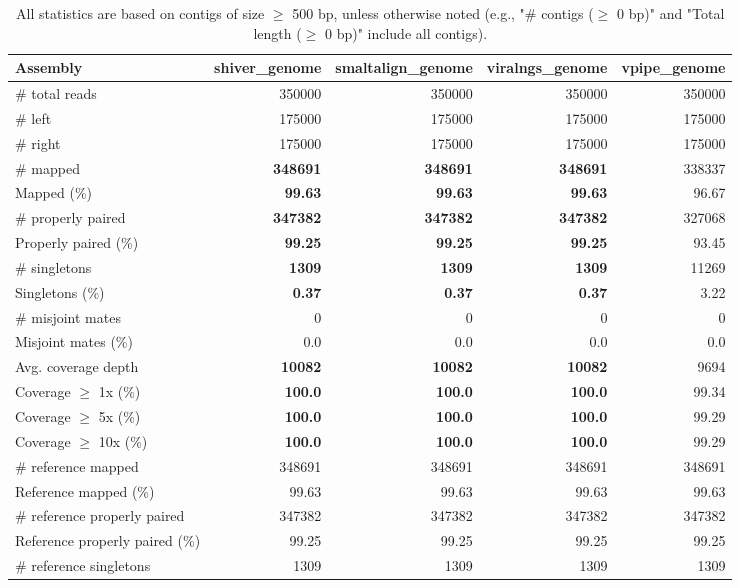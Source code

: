 \documentclass[12pt,a4paper]{article}
\begin{document}
\begin{table}[ht]
\begin{center}
\caption{All statistics are based on contigs of size $\geq$ 500 bp, unless otherwise noted (e.g., "\# contigs ($\geq$ 0 bp)" and "Total length ($\geq$ 0 bp)" include all contigs).}
\begin{tabular}{|l*{4}{|r}|}
\hline
Assembly & shiver\_genome & smaltalign\_genome & viralngs\_genome & vpipe\_genome \\ \hline
\# total reads & 350000 & 350000 & 350000 & 350000 \\ \hline
\# left & 175000 & 175000 & 175000 & 175000 \\ \hline
\# right & 175000 & 175000 & 175000 & 175000 \\ \hline
\# mapped & {\bf 348691} & {\bf 348691} & {\bf 348691} & 338337 \\ \hline
Mapped (\%) & {\bf 99.63} & {\bf 99.63} & {\bf 99.63} & 96.67 \\ \hline
\# properly paired & {\bf 347382} & {\bf 347382} & {\bf 347382} & 327068 \\ \hline
Properly paired (\%) & {\bf 99.25} & {\bf 99.25} & {\bf 99.25} & 93.45 \\ \hline
\# singletons & {\bf 1309} & {\bf 1309} & {\bf 1309} & 11269 \\ \hline
Singletons (\%) & {\bf 0.37} & {\bf 0.37} & {\bf 0.37} & 3.22 \\ \hline
\# misjoint mates & 0 & 0 & 0 & 0 \\ \hline
Misjoint mates (\%) & 0.0 & 0.0 & 0.0 & 0.0 \\ \hline
Avg. coverage depth & {\bf 10082} & {\bf 10082} & {\bf 10082} & 9694 \\ \hline
Coverage $\geq$ 1x (\%) & {\bf 100.0} & {\bf 100.0} & {\bf 100.0} & 99.34 \\ \hline
Coverage $\geq$ 5x (\%) & {\bf 100.0} & {\bf 100.0} & {\bf 100.0} & 99.29 \\ \hline
Coverage $\geq$ 10x (\%) & {\bf 100.0} & {\bf 100.0} & {\bf 100.0} & 99.29 \\ \hline
\# reference mapped & 348691 & 348691 & 348691 & 348691 \\ \hline
Reference mapped (\%) & 99.63 & 99.63 & 99.63 & 99.63 \\ \hline
\# reference properly paired & 347382 & 347382 & 347382 & 347382 \\ \hline
Reference properly paired (\%) & 99.25 & 99.25 & 99.25 & 99.25 \\ \hline
\# reference singletons & 1309 & 1309 & 1309 & 1309 \\ \hline

\end{tabular}
\end{center}
\end{table}
\end{document}
